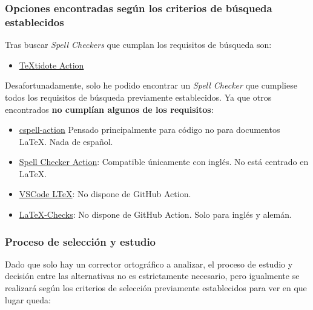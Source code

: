 \subsubsection{Opciones encontradas según los criterios de búsqueda establecidos}

Tras buscar \emph{Spell Checkers} que cumplan los requisitos de búsqueda son:

\begin{itemize}
    \item \href{https://github.com/marketplace/actions/textidote-action}{TeXtidote Action}
\end{itemize}

Desafortunadamente, solo he podido encontrar un \emph{Spell Checker} que
cumpliese todos los requisitos de búsqueda previamente establecidos. Ya que otros
encontrados \textbf{no cumplían algunos de los requisitos}:
\begin{itemize}
    \item \href{https://github.com/marketplace/actions/cspell-action}{cspell-action} Pensado principalmente para código no para documentos LaTeX. Nada de español.
    \item \href{https://github.com/marketplace/actions/spell-checker-action}{Spell Checker Action}: Compatible únicamente con inglés. No está centrado en LaTeX. 
    \item \href{https://github.com/valentjn/vscode-ltex}{VSCode LTeX}: No dispone de GitHub Action.
    \item \href{https://github.com/erodner/latex-checks}{LaTeX-Checks}: No dispone de GitHub Action. Solo para inglés y alemán.
\end{itemize}

\subsubsection{Proceso de selección y estudio}
Dado que solo hay un corrector ortográfico a analizar, el proceso de estudio y
decisión entre las alternativas no es estrictamente necesario, pero igualmente
se realizará según los criterios de selección previamente establecidos para ver
en que lugar queda: 

